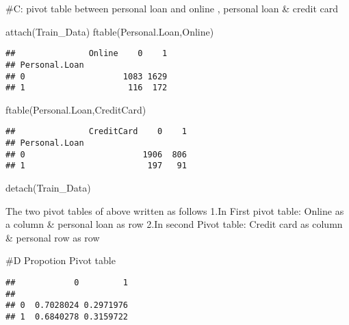 \documentclass[
]{article}
\newenvironment{Shaded}{\begin{snugshade}}{\end{snugshade}}
\newcommand{\AttributeTok}[1]{\textcolor[rgb]{0.77,0.63,0.00}{#1}}
\newcommand{\DecValTok}[1]{\textcolor[rgb]{0.00,0.00,0.81}{#1}}
\newcommand{\FunctionTok}[1]{\textcolor[rgb]{0.00,0.00,0.00}{#1}}
\newcommand{\NormalTok}[1]{#1}
\newcommand{\SpecialCharTok}[1]{\textcolor[rgb]{0.00,0.00,0.00}{#1}}
\begin{document}
\#C: pivot table between personal loan and online , personal loan \&
credit card

\begin{Shaded}
\begin{Highlighting}[]
\FunctionTok{attach}\NormalTok{(Train\_Data)}
\FunctionTok{ftable}\NormalTok{(Personal.Loan,Online)}
\end{Highlighting}
\end{Shaded}

\begin{verbatim}
##               Online    0    1
## Personal.Loan                 
## 0                    1083 1629
## 1                     116  172
\end{verbatim}

\begin{Shaded}
\begin{Highlighting}[]
\FunctionTok{ftable}\NormalTok{(Personal.Loan,CreditCard)}
\end{Highlighting}
\end{Shaded}

\begin{verbatim}
##               CreditCard    0    1
## Personal.Loan                     
## 0                        1906  806
## 1                         197   91
\end{verbatim}

\begin{Shaded}
\begin{Highlighting}[]
\FunctionTok{detach}\NormalTok{(Train\_Data)}
\end{Highlighting}
\end{Shaded}

The two pivot tables of above written as follows 1.In First pivot table:
Online as a column \& personal loan as row 2.In second Pivot table:
Credit card as column \& personal row as row

\#D Propotion Pivot table

\begin{Shaded}
\end{Shaded}

\begin{verbatim}
##            0         1
##                       
## 0  0.7028024 0.2971976
## 1  0.6840278 0.3159722
\end{verbatim}
\end{document}
